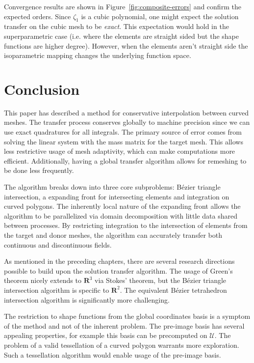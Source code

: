 \documentclass[oneside, reqno]{amsart}
\theoremstyle{definition}
\newcommand{\reals}{\mathbf{R}}
\newcommand{\utri}{\mathcal{U}}
\begin{document}
Convergence results are shown in Figure~\ref{fig:composite-errors}
and confirm the expected orders. Since \(\zeta_1\) is a cubic polynomial,
one might expect the solution transfer on the cubic mesh to be \emph{exact}.
This expectation would hold in the superparametric case (i.e. where the
elements are straight sided but the shape functions are higher degree).
However, when the elements aren't straight side the isoparametric mapping
changes the underlying function space.

\section{Conclusion}

This paper has described a method for conservative interpolation
between curved meshes. The transfer process conserves globally
to machine precision since we can use exact quadratures for all
integrals. The primary source of error comes from solving the linear
system with the mass matrix for the target mesh. This allows
less restrictive usage of mesh adaptivity, which can make computations
more efficient. Additionally, having a global transfer algorithm
allows for remeshing to be done less frequently.

The algorithm breaks down into three core subproblems: B\'{e}zier triangle
intersection, a expanding front for intersecting elements and
integration on curved polygons. The inherently local nature of the
expanding front allows the algorithm to be parallelized via domain
decomposition with little data shared between processes. By
restricting integration to the intersection of elements from the
target and donor meshes, the algorithm can accurately transfer
both continuous and discontinuous fields.

As mentioned in the preceding chapters, there are several research
directions possible to build upon the solution transfer algorithm.
The usage of Green's theorem nicely extends to \(\reals^3\) via
Stokes' theorem, but the B\'{e}zier triangle intersection algorithm
is specific to \(\reals^2\). The equivalent B\'{e}zier tetrahedron
intersection algorithm is significantly more challenging.

The restriction to shape functions from the global coordinates basis
is a symptom of the method and not of the inherent problem. The
pre-image basis has several appealing properties, for example
this basis can be precomputed on \(\utri\). The problem of a
valid tessellation of a curved polygon warrants more exploration.
Such a tessellation algorithm would enable usage of the pre-image
basis.
\end{document}
